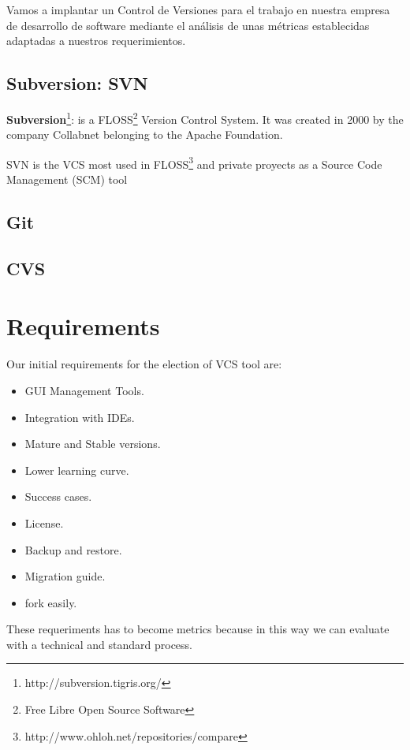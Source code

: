 \documentclass[11pt]{scrartcl}
\begin{document}
\par Vamos a implantar un Control de Versiones para el trabajo en nuestra empresa de desarrollo de software mediante el análisis de unas métricas establecidas adaptadas a nuestros requerimientos.

\subsection{Subversion: SVN}

\textbf{Subversion}\footnote{http://subversion.tigris.org/}: is a FLOSS\footnote{Free Libre Open Source Software} Version Control System. It was created in 2000 by the company Collabnet belonging to the Apache Foundation.

\par SVN is the VCS most used in FLOSS\footnote{http://www.ohloh.net/repositories/compare} and private proyects as a Source Code Management (SCM) tool

\subsection{Git}

\subsection{CVS}

\section{Requirements}

Our initial requirements for the election of VCS tool are:

\begin{itemize}
    \item GUI Management Tools.
    \item Integration with IDEs.
    \item Mature and Stable versions.
    \item Lower learning curve.
    \item Success cases.
    \item License.
    \item Backup and restore.
    \item Migration guide.
    \item fork easily.
\end{itemize}

These requeriments has to become metrics because in this way we can evaluate with a technical and standard process.
\end{document}
